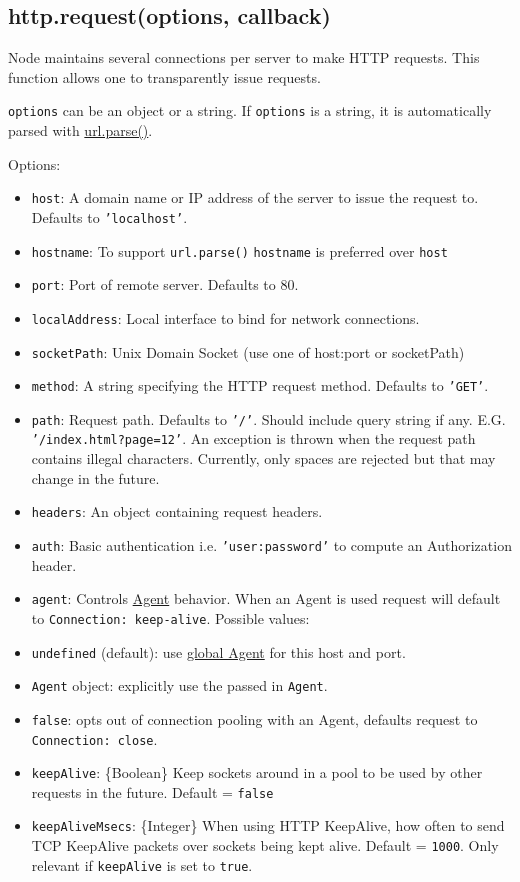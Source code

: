 \subsection{http.request(options, callback)}

Node maintains several connections per server to make HTTP requests.
This function allows one to transparently issue requests.

\texttt{options} can be an object or a string. If \texttt{options} is a
string, it is automatically parsed with
\href{url.html\#url\_url\_parse\_urlstr\_parsequerystring\_slashesdenotehost}{url.parse()}.

Options:

\begin{itemize}
\item
  \texttt{host}: A domain name or IP address of the server to issue the
  request to. Defaults to \texttt{'localhost'}.
\item
  \texttt{hostname}: To support \texttt{url.parse()} \texttt{hostname}
  is preferred over \texttt{host}
\item
  \texttt{port}: Port of remote server. Defaults to 80.
\item
  \texttt{localAddress}: Local interface to bind for network
  connections.
\item
  \texttt{socketPath}: Unix Domain Socket (use one of host:port or
  socketPath)
\item
  \texttt{method}: A string specifying the HTTP request method. Defaults
  to \texttt{'GET'}.
\item
  \texttt{path}: Request path. Defaults to \texttt{'/'}. Should include
  query string if any. E.G. \texttt{'/index.html?page=12'}. An exception
  is thrown when the request path contains illegal characters.
  Currently, only spaces are rejected but that may change in the future.
\item
  \texttt{headers}: An object containing request headers.
\item
  \texttt{auth}: Basic authentication i.e. \texttt{'user:password'} to
  compute an Authorization header.
\item
  \texttt{agent}: Controls \hyperref[http\_class\_http\_agent]{Agent}
  behavior. When an Agent is used request will default to
  \texttt{Connection: keep-alive}. Possible values:
\item
  \texttt{undefined} (default): use
  \hyperref[http\_http\_globalagent]{global Agent} for this host and
  port.
\item
  \texttt{Agent} object: explicitly use the passed in \texttt{Agent}.
\item
  \texttt{false}: opts out of connection pooling with an Agent, defaults
  request to \texttt{Connection: close}.
\item
  \texttt{keepAlive}: \{Boolean\} Keep sockets around in a pool to be
  used by other requests in the future. Default = \texttt{false}
\item
  \texttt{keepAliveMsecs}: \{Integer\} When using HTTP KeepAlive, how
  often to send TCP KeepAlive packets over sockets being kept alive.
  Default = \texttt{1000}. Only relevant if \texttt{keepAlive} is set to
  \texttt{true}.
\end{itemize}

